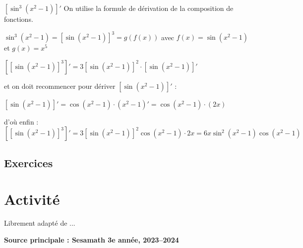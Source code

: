 \documentclass[a4paper,12pt]{article}
\begin{document}
\begin{exemple}
$[\sin^3(x^2 - 1)]'$
	\tcblower
On utilise la formule de dérivation de la composition de fonctions. 

$\sin^3(x^2 - 1) = [\sin(x^2 - 1)]^3 = g(f(x))$ avec $f(x) = \sin(x^2 - 1)$ et $g(x) = x^5$

$[[\sin(x^2 - 1)]^3]' = 3[\sin(x^2 - 1)]^2 \cdot [\sin(x^2 - 1)]'$

et on doit recommencer pour dériver $[\sin(x^2 - 1)]'$ :

$[\sin(x^2 - 1)]' = \cos(x^2 - 1) \cdot (x^2 - 1)' = \cos(x^2 - 1) \cdot (2x)$

d'où enfin : $[[\sin(x^2 - 1)]^3]' = 3[\sin(x^2 - 1)]^2 \cos(x^2 - 1) \cdot 2x = 6x\sin^2(x^2 - 1)\cos(x^2 - 1)$
\end{exemple}

\subsection{Exercices}

\section{Activité}




Librement adapté de ...

{\bfseries Source principale : Sesamath 3e année, 2023--2024}
\end{document}
